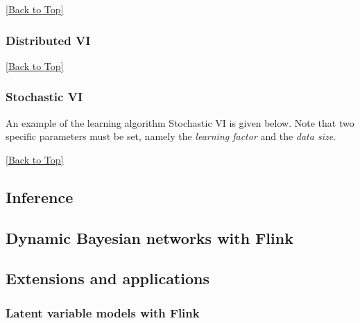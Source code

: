 \documentclass[10pt,a4paper]{article}
\newcommand{\includejavasource}[1]{}
\begin{document}
\includejavasource{../../../../examples/src/main/java/eu/amidst/flinklink/examples/learning/dVMPExample.java}

\hyperref[sec:flinklink]{[Back to Top]}\newline 


\subsubsection{Distributed VI}\label{sec:flinklink:learning:dvi}

\includejavasource{../../../../examples/src/main/java/eu/amidst/flinklink/examples/learning/DistributedVIExample.java}

\hyperref[sec:flinklink]{[Back to Top]}\newline 

\subsubsection{Stochastic VI}\label{sec:flinklink:learning:svi}

An example of the learning algorithm Stochastic VI is given below. Note that two specific parameters must be set, namely the \textit{learning factor} and the \textit{data size}.

\includejavasource{../../../../examples/src/main/java/eu/amidst/flinklink/examples/learning/StochasticVIExample.java}

\hyperref[sec:flinklink]{[Back to Top]}\newline 


\subsection{Inference}\label{sec:flinklink:inference}

\subsection{Dynamic Bayesian networks with Flink}\label{sec:flinklink:dbn}

\subsection{Extensions and applications}\label{sec:flinklink:ext}
\subsubsection{Latent variable models with Flink}\label{sec:flinklink:ext:models}
\end{document}
